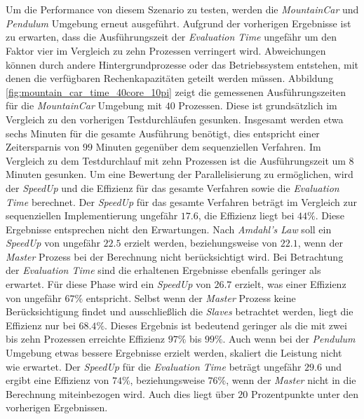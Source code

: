 \\\\
Um die Performance von diesem Szenario zu testen, werden die \emph{MountainCar} und \emph{Pendulum} Umgebung erneut ausgeführt. Aufgrund der vorherigen Ergebnisse ist zu erwarten, dass die Ausführungszeit der \emph{Evaluation Time} ungefähr um den Faktor vier im Vergleich zu zehn Prozessen verringert wird. Abweichungen können durch andere Hintergrundprozesse oder das Betriebssystem entstehen, mit denen die verfügbaren Rechenkapazitäten geteilt werden müssen. Abbildung \ref{fig:mountain_car_time_40core_10pi} zeigt die gemessenen Ausführungszeiten für die \emph{MountainCar} Umgebung mit $40$ Prozessen. Diese ist grundsätzlich im Vergleich zu den vorherigen Testdurchläufen gesunken. Insgesamt werden etwa sechs Minuten für die gesamte Ausführung benötigt, dies entspricht einer Zeitersparnis von $99$ Minuten gegenüber dem sequenziellen Verfahren. Im Vergleich zu dem Testdurchlauf mit zehn Prozessen ist die Ausführungszeit um 8 Minuten gesunken. Um eine Bewertung der Parallelisierung zu ermöglichen, wird der \emph{SpeedUp} und die Effizienz für das gesamte Verfahren sowie die \emph{Evaluation Time} berechnet.  Der \emph{SpeedUp} für das gesamte Verfahren beträgt im Vergleich zur sequenziellen Implementierung ungefähr $17.6$, die Effizienz liegt bei $44\%$. Diese Ergebnisse entsprechen nicht den Erwartungen. Nach \emph{Amdahl's Law} soll ein \emph{SpeedUp} von ungefähr $22.5$ erzielt werden, beziehungsweise von $22.1$, wenn der \emph{Master} Prozess bei der Berechnung nicht berücksichtigt wird. Bei Betrachtung der \emph{Evaluation Time} sind die erhaltenen  Ergebnisse ebenfalls geringer als erwartet. Für diese Phase wird ein \emph{SpeedUp} von $26.7$ erzielt, was einer Effizienz von ungefähr $67\%$ entspricht. Selbst wenn der \emph{Master} Prozess keine Berücksichtigung findet und ausschließlich die \emph{Slaves} betrachtet werden, liegt die Effizienz nur bei $68.4\%$. Dieses Ergebnis ist bedeutend geringer als die mit zwei bis zehn Prozessen erreichte Effizienz $97\%$ bis $99\%$. Auch wenn bei der \emph{Pendulum} Umgebung etwas bessere Ergebnisse erzielt werden, skaliert die Leistung nicht wie erwartet. Der \emph{SpeedUp} für die \emph{Evaluation Time} beträgt ungefähr $29.6$ und ergibt eine Effizienz von $74\%$, beziehungsweise $76\%$, wenn der \emph{Master} nicht in die Berechnung miteinbezogen wird. Auch dies liegt über $20$ Prozentpunkte unter den vorherigen Ergebnissen. 
\\\\
